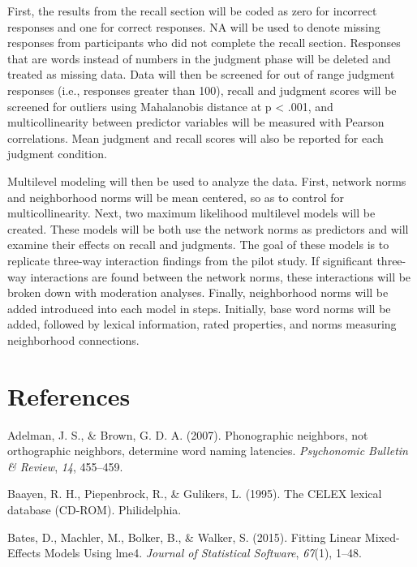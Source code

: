 \documentclass[english,man]{apa6}
\theoremstyle{definition}
\theoremstyle{definition}
\theoremstyle{definition}
\theoremstyle{remark}
\begin{document}
First, the results from the recall section will be coded as zero for
incorrect responses and one for correct responses. NA will be used to
denote missing responses from participants who did not complete the
recall section. Responses that are words instead of numbers in the
judgment phase will be deleted and treated as missing data. Data will
then be screened for out of range judgment responses (i.e., responses
greater than 100), recall and judgment scores will be screened for
outliers using Mahalanobis distance at p \textless{} .001, and
multicollinearity between predictor variables will be measured with
Pearson correlations. Mean judgment and recall scores will also be
reported for each judgment condition.

Multilevel modeling will then be used to analyze the data. First,
network norms and neighborhood norms will be mean centered, so as to
control for multicollinearity. Next, two maximum likelihood multilevel
models will be created. These models will be both use the network norms
as predictors and will examine their effects on recall and judgments.
The goal of these models is to replicate three-way interaction findings
from the pilot study. If significant three-way interactions are found
between the network norms, these interactions will be broken down with
moderation analyses. Finally, neighborhood norms will be added
introduced into each model in steps. Initially, base word norms will be
added, followed by lexical information, rated properties, and norms
measuring neighborhood connections.

\newpage

\section{References}\label{references}

\setlength{\parindent}{-0.5in} \setlength{\leftskip}{0.5in}

\hypertarget{refs}{}
\hypertarget{ref-Adelman2007}{}
Adelman, J. S., \& Brown, G. D. A. (2007). Phonographic neighbors, not
orthographic neighbors, determine word naming latencies.
\emph{Psychonomic Bulletin \& Review}, \emph{14}, 455--459.

\hypertarget{ref-Baayen1995}{}
Baayen, R. H., Piepenbrock, R., \& Gulikers, L. (1995). The CELEX
lexical database (CD-ROM). Philidelphia.

\hypertarget{ref-Bates2015}{}
Bates, D., Machler, M., Bolker, B., \& Walker, S. (2015). Fitting Linear
Mixed-Effects Models Using lme4. \emph{Journal of Statistical Software},
\emph{67}(1), 1--48.
\end{document}

